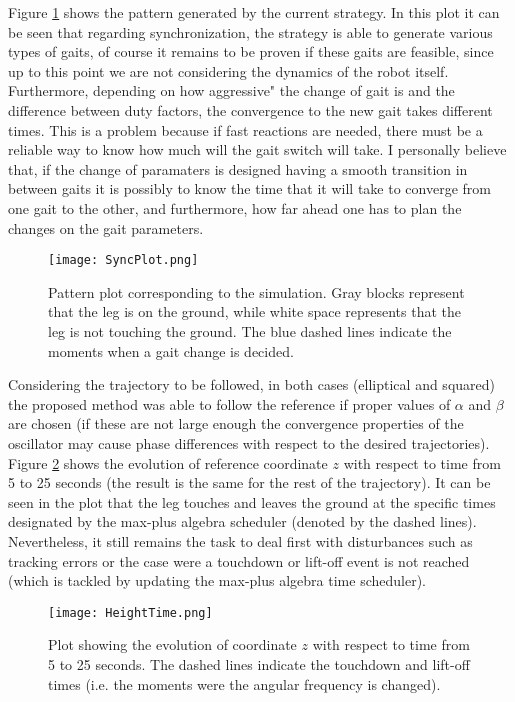 \documentclass[main.tex]{subfiles}
\begin{document}
Figure \ref{fig:SyncPlot} shows the pattern generated by the current strategy. In this plot it can be seen that regarding synchronization, the strategy is able to generate various types of gaits, of course it remains to be proven if these gaits are feasible, since up to this point we are not considering the dynamics of the robot itself. Furthermore, depending on how aggressive" the change of gait is and the difference between duty factors, the convergence to the new gait takes different times. This is a problem because if fast reactions are needed, there must be a reliable way to know how much will the gait switch will take. I personally believe that, if the change of paramaters is designed having a smooth transition in between gaits it is possibly to know the time that it will take to converge from one gait to the other, and furthermore, how far ahead one has to plan the changes on the gait parameters.
\begin{figure}[t]\centering
		\texttt{[image: SyncPlot.png]}
		\caption{Pattern plot corresponding to the simulation. Gray blocks represent that the leg is on the ground, while white space represents that the leg is not touching the ground. The blue dashed lines indicate the moments when a gait change is decided.
			\label{fig:SyncPlot} }
\end{figure}

Considering the trajectory to be followed, in both cases (elliptical and squared) the proposed method was able to follow the reference if proper values of $\alpha$ and $\beta$ are chosen (if these are not large enough the convergence properties of the oscillator may cause phase differences with respect to the desired trajectories). Figure \ref{fig:HeightTime} shows the evolution of reference coordinate $z$ with respect to time from 5 to 25 seconds (the result is the same for the rest of the trajectory). It can be seen in the plot that the leg touches and leaves the ground at the specific times designated by the max-plus algebra scheduler (denoted by the dashed lines). Nevertheless, it still remains the task to deal first with disturbances such as tracking errors or the case were a touchdown or lift-off event is not reached (which is tackled by updating the max-plus algebra time scheduler).
\begin{figure}[t]\centering
		\texttt{[image: HeightTime.png]}
		\caption{Plot showing the evolution of coordinate $z$ with respect to time from 5 to 25 seconds. The dashed lines indicate the touchdown and lift-off times (i.e. the moments were the angular frequency is changed).
			\label{fig:HeightTime} }
\end{figure}
\end{document}
